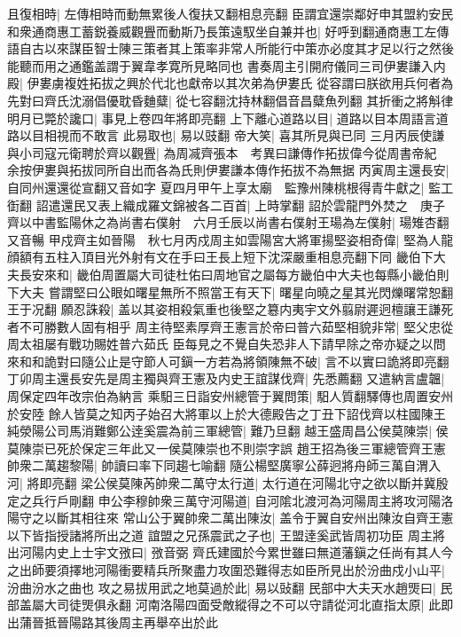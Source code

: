 且復相時|{
	左傳相時而動無累後人復扶又翻相息亮翻}
臣謂宜還崇鄰好申其盟約安民和衆通商惠工蓄鋭養威觀舋而動斯乃長策遠馭坐自兼并也|{
	好呼到翻通商惠工左傳語自古以來謀臣智士陳三策者其上策率非常人所能行中策亦必度其才足以行之然後能聽而用之通鑑盖謂于翼韋孝寛所見略同也}
書奏周主引開府儀同三司伊婁謙入内殿|{
	伊婁虜複姓拓拔之興於代北也獻帝以其次弟為伊婁氏}
從容謂曰朕欲用兵何者為先對曰齊氏沈溺倡優耽昏麯糵|{
	從七容翻沈持林翻倡音昌糵魚列翻}
其折衝之將斛律明月已斃於讒口|{
	事見上卷四年將即亮翻}
上下離心道路以目|{
	道路以目本周語言道路以目相視而不敢言}
此易取也|{
	易以豉翻}
帝大笑|{
	喜其所見與已同}
三月丙辰使謙與小司寇元衛聘於齊以觀舋|{
	為周㓕齊張本　考異曰謙傳作拓拔偉今從周書帝紀　余按伊婁與拓拔同所自出而各為氏則伊婁謙本傳作拓拔不為無据}
丙寅周主還長安|{
	自同州還還從宣翻又音如字}
夏四月甲午上享太廟　監豫州陳桃根得青牛獻之|{
	監工衘翻}
詔遣還民又表上織成羅文錦被各二百首|{
	上時掌翻}
詔於雲龍門外焚之　庚子齊以中書監陽休之為尚書右僕射　六月壬辰以尚書右僕射王瑒為左僕射|{
	瑒雉杏翻又音暢}
甲戍齊主如晉陽　秋七月丙戍周主如雲陽宮大將軍揚堅姿相奇偉|{
	堅為人龍顔額有五柱入頂目光外射有文在手曰王長上短下沈深嚴重相息亮翻下同}
畿伯下大夫長安來和|{
	畿伯周置屬大司徒杜佑曰周地官之屬每方畿伯中大夫也每縣小畿伯則下大夫}
嘗謂堅曰公眼如曙星無所不照當王有天下|{
	曙星向曉之星其光閃爍曙常恕翻王于况翻}
願忍誅殺|{
	盖以其姿相殺氣重也後堅之簒内夷宇文外翦尉遲迥檀讓王謙死者不可勝數人固有相乎}
周主待堅素厚齊王憲言於帝曰普六茹堅相貌非常|{
	堅父忠從周太祖屡有戰功賜姓普六茹氏}
臣每見之不覺自失恐非人下請早除之帝亦疑之以問來和和詭對曰隨公止是守節人可鎭一方若為將領陳無不破|{
	言不以實曰詭將即亮翻}
丁卯周主還長安先是周主獨與齊王憲及内史王誼謀伐齊|{
	先悉薦翻}
又遣納言盧韞|{
	周保定四年改宗伯為納言}
乘馹三日詣安州總管于翼問策|{
	馹人質翻驛傳也周置安州於安陸}
餘人皆莫之知丙子始召大將軍以上於大德殿告之丁丑下詔伐齊以柱國陳王純滎陽公司馬消難鄭公逹奚震為前三軍總管|{
	難乃旦翻}
越王盛周昌公侯莫陳崇|{
	侯莫陳崇已死於保定三年此又一侯莫陳崇也不則崇字誤}
趙王招為後三軍總管齊王憲帥衆二萬趨黎陽|{
	帥讀曰率下同趨七喻翻}
隨公楊堅廣寧公薛迥將舟師三萬自渭入河|{
	將即亮翻}
梁公侯莫陳芮帥衆二萬守太行道|{
	太行道在河陽北守之欲以斷并冀殷定之兵行戶剛翻}
申公李穆帥衆三萬守河陽道|{
	自河隂北渡河為河陽周主將攻河陽洛陽守之以斷其相往來}
常山公于翼帥衆二萬出陳汝|{
	盖令于翼自安州出陳汝自齊王憲以下皆指授諸將所出之道}
誼盟之兄孫震武之子也|{
	王盟逹奚武皆周初功臣}
周主將出河陽内史上士宇文㢸曰|{
	㢸音弼}
齊氏建國於今累世雖曰無道藩鎭之任尚有其人今之出師要須擇地河陽衝要精兵所聚盡力攻圍恐難得志如臣所見出於汾曲戍小山平|{
	汾曲汾水之曲也}
攻之易拔用武之地莫過於此|{
	易以䜴翻}
民部中大夫天水趙煚曰|{
	民部盖屬大司徒煚俱永翻}
河南洛陽四面受敵縱得之不可以守請從河北直指太原|{
	此即出蒲晉抵晉陽路其後周主再舉卒出於此}

